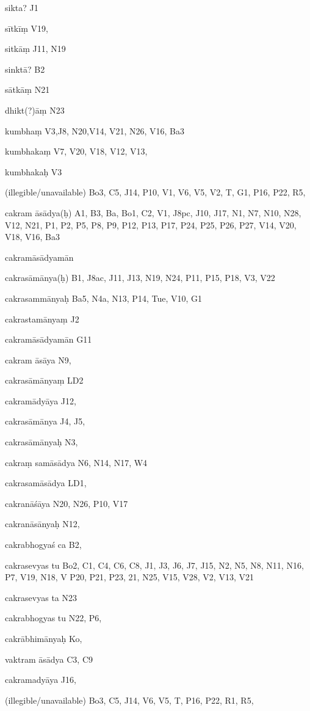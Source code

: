\begin{ekdosis}
\begin{marma}[hp01_055]
\begin{marma}[hp02_009]
\begin{marma}[hp02_011]
\begin{marma}[hp02_54a]
\item[sikta?] J1
\item[sītkīṃ] V19,
\item[sitkāṃ] J11, N19
\item[sinktā?] B2
\item[sātkāṃ] N21
\item[dhikt(?)āṃ] N23
\item[kumbhaṃ] V3,J8, N20,V14, V21, N26, V16, Ba3 
\item[kumbhakaṃ] V7, V20, V18, V12, V13, 
\item[kumbhakaḥ] V3
\item[(illegible/unavailable)] Bo3, C5, J14, P10, V1, V6, V5, V2, T, G1, P16, P22, R5,
  \begin{description}

    \end{description}
 \end{marma}


 \begin{marma}[hp02_55a]
\item[cakram āsādya(ḥ)] A1, B3, Ba, Bo1, C2, V1, J8pc, J10, J17, N1, N7, N10, N28, V12,
 N21, P1, P2, P5, P8, P9, P12, P13, P17, P24, P25, P26, P27, V14, V20, V18, V16, Ba3
\item[cakramāsādyamān] 
\item[cakrasāmānya(ḥ)] B1, J8ac, J11, J13, N19, N24, P11, P15, P18, V3, V22
\item[cakrasammānyaḥ] Ba5, N4a, N13, P14, Tue, V10, G1
\item[cakrastamānyaṃ] J2
\item[cakramāsādyamān] G11
\item[cakram āsāya] N9,
\item[cakrasāmānyaṃ] LD2
\item[cakramādyāya] J12,
\item[cakrasāmānya] J4, J5,
\item[cakrasāmānyaḥ] N3, 
\item[cakraṃ samāsādya] N6, N14, N17, W4
\item[cakrasamāsādya] LD1,
\item[cakranāśāya] N20, N26, P10, V17
\item[cakranāsānyaḥ] N12, 
\item[cakrabhogyaś ca] B2,
\item[cakrasevyas tu] Bo2, C1, C4, C6, C8, J1, J3, J6, J7, J15, N2, N5, N8, N11, N16, P7, V19, N18, V P20, P21, P23, 21, N25, V15, V28, V2, V13, V21
\item[cakrasevyas ta] N23
\item[cakrabhogyas tu] N22, P6, 
\item[cakrābhimānyaḥ] Ko,
\item[vaktram āsādya] C3, C9
\item[cakramadyāya] J16,
\item[(illegible/unavailable)] Bo3, C5, J14, V6, V5, T, P16, P22, R1, R5,
  \begin{description}


\end{description}
\end{marma}
\end{marma}
\end{marma}
\end{marma}
\end{ekdosis}
